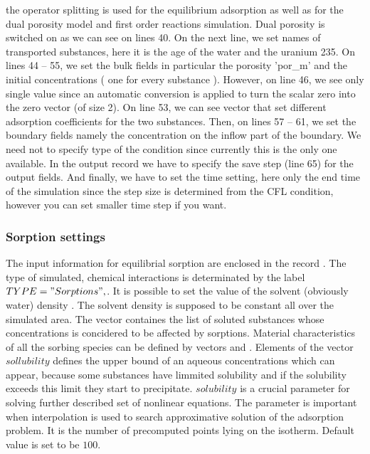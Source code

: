 \documentclass[12pt,a4paper]{report}
\begin{document}
the operator splitting is used for the equilibrium adsorption as well as for the dual porosity model and first order reactions simulation. Dual porosity is switched on as we can see on lines 40. On the next line, 
we set names of transported substances, here it is the age of the water and the uranium 235. On lines 44 -- 55, we set the bulk fields in particular the porosity 'por\_m' and the initial concentrations 
( one for every substance ). However, on line 46, we see only single value since an automatic conversion is applied to turn the scalar zero into the zero vector (of size 2). 
On line 53, we can see vector that set different adsorption coefficients for the two substances. Then, on lines 57 -- 61, we set the boundary fields namely the concentration on the inflow part of the boundary.
We need not to specify type of the condition since currently this is the only one available. In the output record we have to specify the save step (line 65) for the output fields. And finally,
we have to set the time setting, here only the end time of the simulation since the step size is determined from the CFL condition, however you can set smaller time step if you want.

\subsubsection{Sorption settings}\label{subsubsec:sorptions}
The input information for equilibrial sorption are enclosed in the record . The type of simulated, chemical interactions is determinated by the label $TYPE="Sorptions",$. It is possible to set the value of the solvent (obviously water) density . The solvent density is supposed to be constant all over the simulated area. The vector  containes the list of soluted substances whose concentrations is concidered to be affected by sorptions. Material characteristics of all the sorbing species can be defined by vectors  and . Elements of the vector $sollubility$ defines the upper bound of an aqueous concentrations which can appear, because some substances have limmited solubility and if the solubility exceeds this limit they start to precipitate. $solubility$ is 
a crucial parameter for solving further described set of nonlinear equations. The parameter  is important when interpolation is used to search approximative solution of the adsorption problem. It is the number of precomputed points lying on the isotherm. Default value is set to be $100$.
\end{document}
